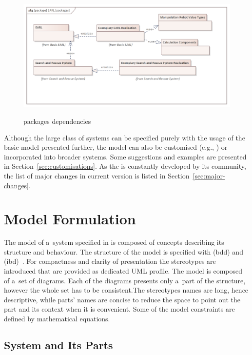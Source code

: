 \documentclass[11pt,oneside,a4paper]{article}
\begin{document}
	\begin{figure}[H]
		\centering
		\begin{center}
			{\includegraphics[width=0.9\columnwidth]{img/packages.png}}
		\end{center}
		\caption{\EARL{} packages dependencies}
		\label{fig:earl}
	\end{figure}
	
	
	 Although the large class of systems can be specified purely with the usage of the basic model presented further, the model can also be customised (e.g., \cite{winiarski-intent-20,karwowski2021hubero}) or incorporated into broader systems.
	 Some suggestions and examples are presented in Section~\ref{sec:customisations}. As the \EARL{} is constantly developed by its community, the list of major changes in \EARL{} current version is listed in Section~\ref{sec:major-changes}.

	\section{Model Formulation}
	\label{sec:ea-sysml}
	
	The model of a~system specified in \EARL{} is composed of concepts describing its structure and behaviour.
	The structure of the model is specified with \SysML{} \BlockDefinition{} \Diagrams{} (bdd) and \InternalBlock{} \Diagrams{} (ibd)~\cite{omg-sysml16}.
	For compactness and clarity of presentation the stereotypes are introduced that are provided as dedicated UML profile.
	The model is composed of a~set of diagrams. Each of the diagrams presents only a~part of the structure, however the whole set has to be consistent.The stereotypes names are long, hence descriptive, while parts' names are concise to reduce the space to point out the part and its context when it is convenient. 
	Some of the model constraints are defined by mathematical equations. 
		
	
	\subsection{System and Its Parts}
	\label{subsec:sys-a-subsys}
	
\end{document}
